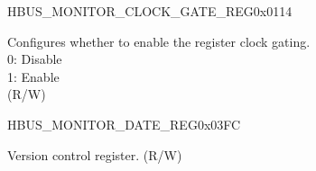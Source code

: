 \begin{register}{H}{BUS\_MONITOR\_CLOCK\_GATE\_REG}{0x0114}\label{regdesc:BUSMONITORCLOCKGATEREG}
%
%
\regnewline%
\begin{regdesc}\begin{reglist}
\label{fielddesc:BUSMONITORCLKEN}\item [BUS\_MONITOR\_CLK\_EN] Configures whether to enable the register clock gating. \\
0: Disable\\
1: Enable\\ (R/W)
\end{reglist}\end{regdesc}
\end{register}


\begin{register}{H}{BUS\_MONITOR\_DATE\_REG}{0x03FC}\label{regdesc:BUSMONITORDATEREG}
%
%
\regnewline%
\begin{regdesc}\begin{reglist}
\label{fielddesc:BUSMONITORDATE}\item [BUS\_MONITOR\_DATE] Version control register. (R/W)
\end{reglist}\end{regdesc}
\end{register}
